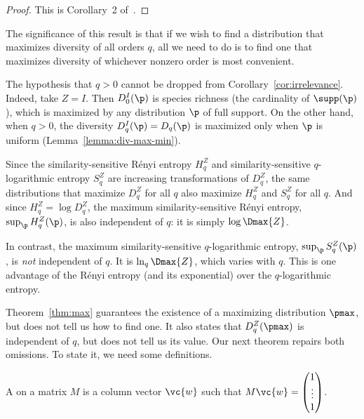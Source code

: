\begin{proof}
This is Corollary~2 of~\cite{MDBB}.
\end{proof}

The significance of this result is that if we wish to find a distribution
that maximizes diversity of all orders $q$, all we need to do is to find
one that maximizes diversity of whichever nonzero order is most convenient.

The hypothesis that $q > 0$ cannot be dropped from
Corollary~\ref{cor:irrelevance}.  Indeed, take $Z = I$.  Then $D_0^I(\p)$
is species richness%
%
% 
(the cardinality of $\supp(\p)$), which is maximized by any distribution
$\p$ of full support.  On the other hand, when $q > 0$, the diversity
$D_q^I(\p) = D_q(\p)$ is maximized only when $\p$ is uniform
(Lemma~\ref{lemma:div-max-min}).

\begin{remark}
Since the similarity-sensitive R\'enyi entropy $H_q^Z$ and
similarity-sensitive $q$-logarithmic entropy $S_q^Z$ are increasing
transformations of $D_q^Z$, the same distributions that maximize $D_q^Z$
for all $q$ also maximize $H_q^Z$ and $S_q^Z$ for all $q$.  And since
$H_q^Z = \log D_q^Z$, the maximum similarity-sensitive R\'enyi entropy,
$\sup_\p H_q^Z(\p)$, is also independent of $q$: it is simply $\log
\Dmax{Z}$.

In contrast, the maximum similarity-sensitive $q$-logarithmic entropy,
$\sup_\p S_q^Z(\p)$, is \emph{not} independent of $q$.  It is $\ln_q
\Dmax{Z}$, which varies with $q$.  This is one advantage%
% 
%
% 
of the R\'enyi entropy (and its exponential) over the $q$-logarithmic
entropy.
\end{remark}

Theorem~\ref{thm:max} guarantees the existence of a maximizing distribution
$\pmax$, but does not tell us how to find one.  It also states that
$D_q^Z(\pmax)$ is independent of $q$, but does not tell us its value.  Our
next theorem repairs both omissions.  To state it, we need some definitions.

\begin{defn}
A  on a matrix $M$ is a column vector $\vc{w}$ such
that $M\vc{w} = \begin{pmatrix}
  1\\ \vdots\\ 1 \end{pmatrix}$.
\end{defn}

